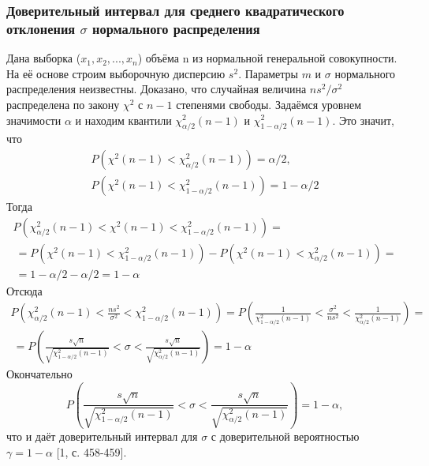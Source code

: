 \documentclass[a4paper,14pt]{article}
\begin{document}
	\subsubsection{Доверительный интервал для среднего квадратического отклонения $\sigma$ нормального распределения}
	Дана выборка ($x_{1},x_{2}, ... ,x_{n}$) объёма n из нормальной генеральной совокупности. На её основе строим выборочную дисперсию $s^{2}$. Параметры $m$ и $\sigma$ нормального распределения неизвестны. Доказано, что случайная величина $ns^{2}/\sigma^{2}$ распределена по закону $\chi^{2}$ с $n-1$ степенями свободы.
	\newline
	Задаёмся уровнем значимости $\alpha$ и находим квантили $\chi^{2}_{\alpha/2}(n-1)$ и $\chi^{2}_{1-\alpha/2}(n-1)$.
	\newline
	Это значит, что 
	\begin{equation}
		\begin{split}
			P\left(\chi^{2}(n-1) < \chi^{2}_{\alpha/2}(n-1)\right) = \alpha/2, \\
			P\left(\chi^{2}(n-1) < \chi^{2}_{1-\alpha/2}(n-1)\right) = 1-\alpha/2
		\end{split}
		\label{P_chi_2x2}        
	\end{equation}
	Тогда
	\begin{multline}
		P\left(\chi^{2}_{\alpha/2}(n-1) < \chi^{2}(n-1) < \chi^{2}_{1-\alpha/2}(n-1)\right) = \\\ =
		P\left(\chi^{2}(n-1) < \chi^{2}_{1-\alpha/2}(n-1)\right) -P\left(\chi^{2}(n-1) < \chi^{2}_{\alpha/2}(n-1)\right) = \\\ = 1 - \alpha/2 -\alpha/2 = 1 - \alpha
		\label{P_chi_2}
	\end{multline}
	Отсюда
	\begin{multline}
		P\left(\chi^{2}_{\alpha/2}(n-1) < \frac{ns^{2}}{\sigma^{2}} < \chi^{2}_{1-\alpha/2}(n-1)\right) =
		P\left(\frac{1}{\chi^{2}_{1-\alpha/2}(n-1)} < \frac{\sigma^{2}}{ns^{2}} < \frac{1}{\chi^{2}_{\alpha/2}(n-1)} \right) = \\\ =
		P\left(\frac{s\sqrt{n}}{\sqrt{\chi^{2}_{1-\alpha/2}(n-1)}} < \sigma <  \frac{s\sqrt{n}}{\sqrt{\chi^{2}_{\alpha/2}(n-1)}}\right) = 1- \alpha
		\label{interv}
	\end{multline}
	Окончательно
	\begin{equation}
		P\left(\frac{s\sqrt{n}}{\sqrt{\chi^{2}_{1-\alpha/2}(n-1)}} < \sigma <  \frac{s\sqrt{n}}{\sqrt{\chi^{2}_{\alpha/2}(n-1)}}\right) = 1- \alpha,
		\label{fin_interval}
	\end{equation}
	что и даёт доверительный интервал для $\sigma$ с доверительной вероятностью $\gamma = 1 - \alpha$ [1, с. 458-459].
	
\end{document}
